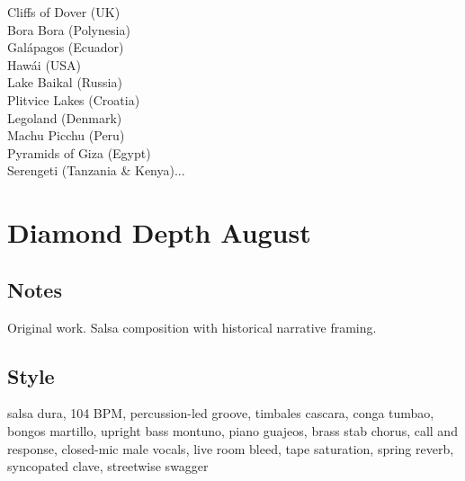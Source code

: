 \begin{lyrics}

Cliffs of Dover (UK)\\
Bora Bora (Polynesia)\\
Galápagos (Ecuador)\\
Hawái (USA)\\
Lake Baikal (Russia)\\
Plitvice Lakes (Croatia)\\
Legoland (Denmark)\\
Machu Picchu (Peru)\\
Pyramids of Giza (Egypt)\\
Serengeti (Tanzania \& Kenya)...

\end{lyrics}

\section{Diamond Depth August}

\subsection{Notes}
Original work.
Salsa composition with historical narrative framing.

\subsection{Style}
salsa dura, 104 BPM, percussion-led groove, timbales cascara, conga tumbao, bongos martillo, upright bass montuno, piano guajeos, brass stab chorus, call and response, closed-mic male vocals, live room bleed, tape saturation, spring reverb, syncopated clave, streetwise swagger

